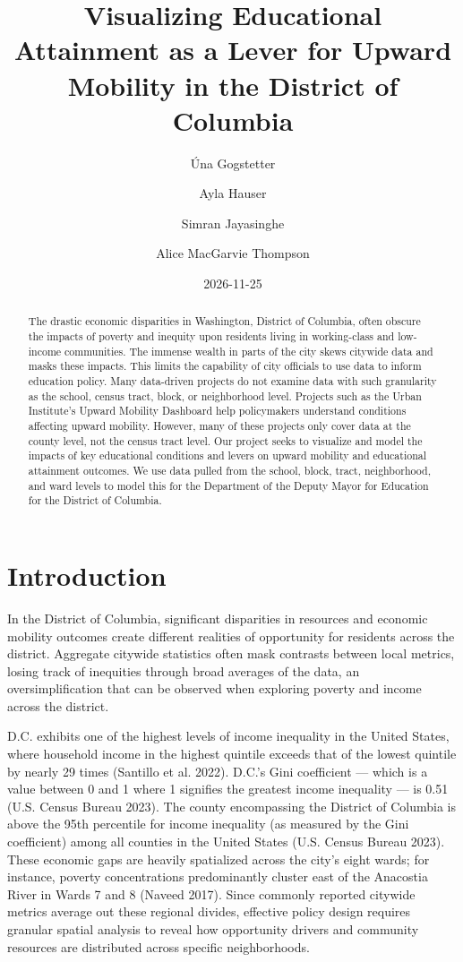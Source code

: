 \documentclass[
  letterpaper,
  DIV=11,
  numbers=noendperiod]{scrartcl}
\title{Visualizing Educational Attainment as a Lever for Upward Mobility
in the District of Columbia}
\author{Úna Gogstetter \and Ayla Hauser \and Simran
Jayasinghe \and Alice MacGarvie Thompson}
\date{2026-11-25}
\begin{document}
\maketitle
\begin{abstract}
The drastic economic disparities in Washington, District of Columbia,
often obscure the impacts of poverty and inequity upon residents living
in working-class and low-income communities. The immense wealth in parts
of the city skews citywide data and masks these impacts. This limits the
capability of city officials to use data to inform education policy.
Many data-driven projects do not examine data with such granularity as
the school, census tract, block, or neighborhood level. Projects such as
the Urban Institute's Upward Mobility Dashboard help policymakers
understand conditions affecting upward mobility. However, many of these
projects only cover data at the county level, not the census tract
level. Our project seeks to visualize and model the impacts of key
educational conditions and levers on upward mobility and educational
attainment outcomes. We use data pulled from the school, block, tract,
neighborhood, and ward levels to model this for the Department of the
Deputy Mayor for Education for the District of Columbia.
\end{abstract}


\section{Introduction}\label{introduction}

In the District of Columbia, significant disparities in resources and
economic mobility outcomes create different realities of opportunity for
residents across the district. Aggregate citywide statistics often mask
contrasts between local metrics, losing track of inequities through
broad averages of the data, an oversimplification that can be observed
when exploring poverty and income across the district.

D.C. exhibits one of the highest levels of income inequality in the
United States, where household income in the highest quintile exceeds
that of the lowest quintile by nearly 29 times (Santillo et al. 2022).
D.C.'s Gini coefficient --- which is a value between 0 and 1 where 1
signifies the greatest income inequality --- is 0.51 (U.S. Census Bureau
2023). The county encompassing the District of Columbia is above the
95th percentile for income inequality (as measured by the Gini
coefficient) among all counties in the United States (U.S. Census Bureau
2023). These economic gaps are heavily spatialized across the city's
eight wards; for instance, poverty concentrations predominantly cluster
east of the Anacostia River in Wards 7 and 8 (Naveed 2017). Since
commonly reported citywide metrics average out these regional divides,
effective policy design requires granular spatial analysis to reveal how
opportunity drivers and community resources are distributed across
specific neighborhoods.
\end{document}
